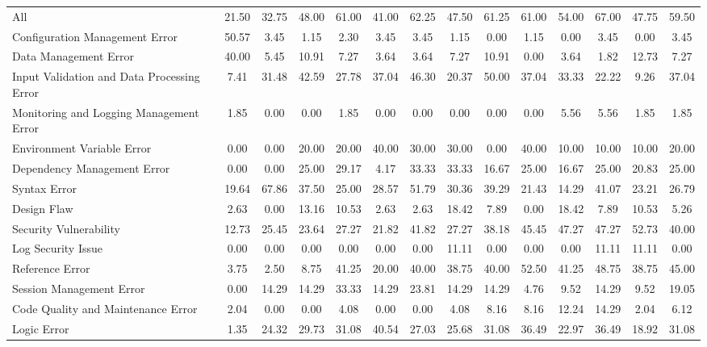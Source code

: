 \documentclass[11pt, a4paper, logo, copyright, nonumbering, amsart]{map}
\begin{document}
\begin{CJK*}{UTF8}{gbsn}
\begin{table*}[t]
\begin{adjustbox}{width=\textwidth}
\begin{tabular}{l|ccccccccccccc}
        \midrule
        All & 21.50 & 32.75 & 48.00 & 61.00 & 41.00 & 62.25 & 47.50 & 61.25 & 61.00 & 54.00 & 67.00 & 47.75 & 59.50 \\
        Configuration Management Error & 50.57 & 3.45 & 1.15 & 2.30 & 3.45 & 3.45 & 1.15 & 0.00 & 1.15 & 0.00 & 3.45 & 0.00 & 3.45 \\
        Data Management Error & 40.00 & 5.45 & 10.91 & 7.27 & 3.64 & 3.64 & 7.27 & 10.91 & 0.00 & 3.64 & 1.82 & 12.73 & 7.27 \\
        Input Validation and Data Processing Error & 7.41 & 31.48 & 42.59 & 27.78 & 37.04 & 46.30 & 20.37 & 50.00 & 37.04 & 33.33 & 22.22 & 9.26 & 37.04 \\
        Monitoring and Logging Management Error & 1.85 & 0.00 & 0.00 & 1.85 & 0.00 & 0.00 & 0.00 & 0.00 & 0.00 & 5.56 & 5.56 & 1.85 & 1.85 \\
        Environment Variable Error & 0.00 & 0.00 & 20.00 & 20.00 & 40.00 & 30.00 & 30.00 & 0.00 & 40.00 & 10.00 & 10.00 & 10.00 & 20.00 \\
        Dependency Management Error & 0.00 & 0.00 & 25.00 & 29.17 & 4.17 & 33.33 & 33.33 & 16.67 & 25.00 & 16.67 & 25.00 & 20.83 & 25.00 \\
        Syntax Error & 19.64 & 67.86 & 37.50 & 25.00 & 28.57 & 51.79 & 30.36 & 39.29 & 21.43 & 14.29 & 41.07 & 23.21 & 26.79 \\
        Design Flaw & 2.63 & 0.00 & 13.16 & 10.53 & 2.63 & 2.63 & 18.42 & 7.89 & 0.00 & 18.42 & 7.89 & 10.53 & 5.26 \\
        Security Vulnerability & 12.73 & 25.45 & 23.64 & 27.27 & 21.82 & 41.82 & 27.27 & 38.18 & 45.45 & 47.27 & 47.27 & 52.73 & 40.00 \\
        Log Security Issue & 0.00 & 0.00 & 0.00 & 0.00 & 0.00 & 0.00 & 11.11 & 0.00 & 0.00 & 0.00 & 11.11 & 11.11 & 0.00 \\
        Reference Error & 3.75 & 2.50 & 8.75 & 41.25 & 20.00 & 40.00 & 38.75 & 40.00 & 52.50 & 41.25 & 48.75 & 38.75 & 45.00 \\
        Session Management Error & 0.00 & 14.29 & 14.29 & 33.33 & 14.29 & 23.81 & 14.29 & 14.29 & 4.76 & 9.52 & 14.29 & 9.52 & 19.05 \\
        Code Quality and Maintenance Error & 2.04 & 0.00 & 0.00 & 4.08 & 0.00 & 0.00 & 4.08 & 8.16 & 8.16 & 12.24 & 14.29 & 2.04 & 6.12 \\
        Logic Error & 1.35 & 24.32 & 29.73 & 31.08 & 40.54 & 27.03 & 25.68 & 31.08 & 36.49 & 22.97 & 36.49 & 18.92 & 31.08 \\

\end{tabular}
\end{adjustbox}
\end{table*}
\end{CJK*}
\end{document}
